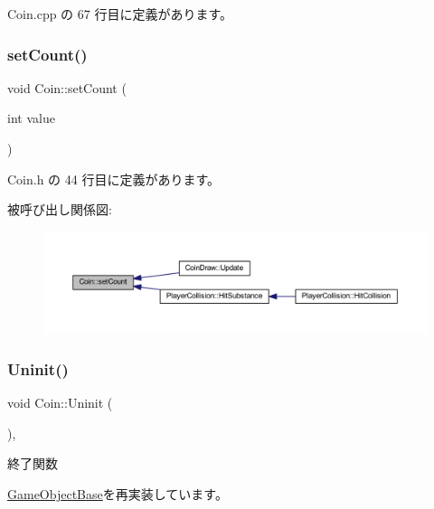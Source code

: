  Coin.\+cpp の 67 行目に定義があります。

\mbox{\label{class_coin_acb3027a1a45470723b7952c73af69878}} 
\subsubsection{\texorpdfstring{set\+Count()}{setCount()}}
{\footnotesize\ttfamily void Coin\+::set\+Count (\begin{DoxyParamCaption}\item[{int}]{value }\end{DoxyParamCaption})\hspace{0.3cm}{\ttfamily [inline]}}



 Coin.\+h の 44 行目に定義があります。

被呼び出し関係図\+:\nopagebreak
\begin{figure}[H]
\begin{center}
\leavevmode
\includegraphics[width=350pt]{class_coin_acb3027a1a45470723b7952c73af69878_icgraph}
\end{center}
\end{figure}
\mbox{\label{class_coin_a4d364dcb4b57b80ea00ce931d0bb300f}} 
\subsubsection{\texorpdfstring{Uninit()}{Uninit()}}
{\footnotesize\ttfamily void Coin\+::\+Uninit (\begin{DoxyParamCaption}{ }\end{DoxyParamCaption})\hspace{0.3cm}{\ttfamily [override]}, {\ttfamily [virtual]}}



終了関数 



\mbox{\hyperlink{class_game_object_base_a97e1bc277d7b1c0156d4735de29a022c}{Game\+Object\+Base}}を再実装しています。



